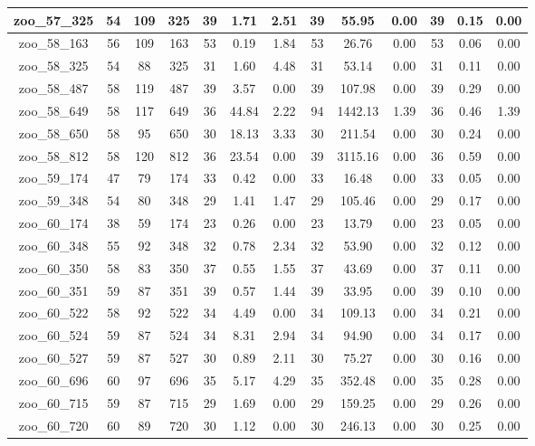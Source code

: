 \begin{landscape}
\begin{longtable}{|c|c|c|c|c|c|c|c|c|c|c|c|c|}
zoo\_57\_325 & 54 & 109 & 325 & 39 & 1.71 & 2.51 & 39 & 55.95 & 0.00 & 39 & 0.15 & 0.00 \\ \hline 
zoo\_58\_163 & 56 & 109 & 163 & 53 & 0.19 & 1.84 & 53 & 26.76 & 0.00 & 53 & 0.06 & 0.00 \\ \hline 
zoo\_58\_325 & 54 & 88 & 325 & 31 & 1.60 & 4.48 & 31 & 53.14 & 0.00 & 31 & 0.11 & 0.00 \\ \hline 
zoo\_58\_487 & 58 & 119 & 487 & 39 & 3.57 & 0.00 & 39 & 107.98 & 0.00 & 39 & 0.29 & 0.00 \\ \hline 
zoo\_58\_649 & 58 & 117 & 649 & 36 & 44.84 & 2.22 & 94 & 1442.13 & 1.39 & 36 & 0.46 & 1.39 \\ \hline 
zoo\_58\_650 & 58 & 95 & 650 & 30 & 18.13 & 3.33 & 30 & 211.54 & 0.00 & 30 & 0.24 & 0.00 \\ \hline 
zoo\_58\_812 & 58 & 120 & 812 & 36 & 23.54 & 0.00 & 39 & 3115.16 & 0.00 & 36 & 0.59 & 0.00 \\ \hline 
zoo\_59\_174 & 47 & 79 & 174 & 33 & 0.42 & 0.00 & 33 & 16.48 & 0.00 & 33 & 0.05 & 0.00 \\ \hline 
zoo\_59\_348 & 54 & 80 & 348 & 29 & 1.41 & 1.47 & 29 & 105.46 & 0.00 & 29 & 0.17 & 0.00 \\ \hline 
zoo\_60\_174 & 38 & 59 & 174 & 23 & 0.26 & 0.00 & 23 & 13.79 & 0.00 & 23 & 0.05 & 0.00 \\ \hline 
zoo\_60\_348 & 55 & 92 & 348 & 32 & 0.78 & 2.34 & 32 & 53.90 & 0.00 & 32 & 0.12 & 0.00 \\ \hline 
zoo\_60\_350 & 58 & 83 & 350 & 37 & 0.55 & 1.55 & 37 & 43.69 & 0.00 & 37 & 0.11 & 0.00 \\ \hline 
zoo\_60\_351 & 59 & 87 & 351 & 39 & 0.57 & 1.44 & 39 & 33.95 & 0.00 & 39 & 0.10 & 0.00 \\ \hline 
zoo\_60\_522 & 58 & 92 & 522 & 34 & 4.49 & 0.00 & 34 & 109.13 & 0.00 & 34 & 0.21 & 0.00 \\ \hline 
zoo\_60\_524 & 59 & 87 & 524 & 34 & 8.31 & 2.94 & 34 & 94.90 & 0.00 & 34 & 0.17 & 0.00 \\ \hline 
zoo\_60\_527 & 59 & 87 & 527 & 30 & 0.89 & 2.11 & 30 & 75.27 & 0.00 & 30 & 0.16 & 0.00 \\ \hline 
zoo\_60\_696 & 60 & 97 & 696 & 35 & 5.17 & 4.29 & 35 & 352.48 & 0.00 & 35 & 0.28 & 0.00 \\ \hline 
zoo\_60\_715 & 59 & 87 & 715 & 29 & 1.69 & 0.00 & 29 & 159.25 & 0.00 & 29 & 0.26 & 0.00 \\ \hline 
zoo\_60\_720 & 60 & 89 & 720 & 30 & 1.12 & 0.00 & 30 & 246.13 & 0.00 & 30 & 0.25 & 0.00 \\ \hline 

\end{longtable}
\end{landscape}
